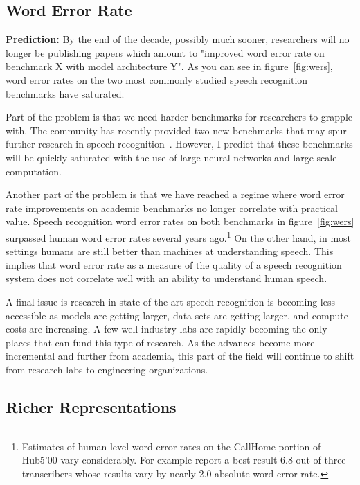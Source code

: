 \subsection{Word Error Rate}
\label{sec:wer}

{\bf Prediction:} By the end of the decade, possibly much sooner, researchers
will no longer be publishing papers which amount to "improved word error rate
on benchmark X with model architecture Y". As you can see in
figure~\ref{fig:wers}, word error rates on the two most commonly studied speech
recognition benchmarks have saturated.

Part of the problem is that we need harder benchmarks for researchers to
grapple with. The community has recently provided two new benchmarks that may
spur further research in speech recognition~\citep{chen2021gigaspeech,
galvez2021people}. However, I predict that these benchmarks will be quickly
saturated with the use of large neural networks and large scale
computation.

Another part of the problem is that we have reached a regime where word error
rate improvements on academic benchmarks no longer correlate with practical
value. Speech recognition word error rates on both benchmarks in
figure~\ref{fig:wers} surpassed human word error rates several years
ago.\footnote{Estimates of human-level word error rates on the CallHome portion
of Hub5'00 vary considerably. For example \citet{saon2017english} report a best
result 6.8 out of three transcribers whose results vary by nearly 2.0 absolute
word error rate.} On the other hand, in most settings humans are still better
than machines at understanding speech. This implies that word error rate as a
measure of the quality of a speech recognition system does not correlate well
with an ability to understand human speech.

A final issue is research in state-of-the-art speech recognition is becoming
less accessible as models are getting larger, data sets are getting larger, and
compute costs are increasing. A few well industry labs are rapidly becoming the
only places that can fund this type of research. As the advances become more
incremental and further from academia, this part of the field will continue to
shift from research labs to engineering organizations.

\subsection{Richer Representations}


